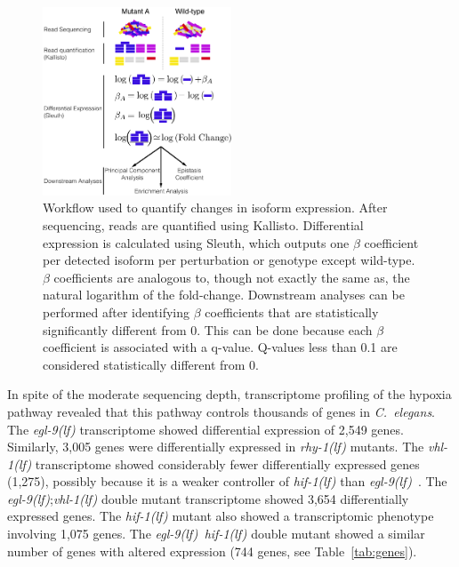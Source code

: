 \documentclass[10pt, onecolumn]{article}
\newcommand{\cel}{\emph{C.~elegans}}
\newcommand{\egl}{\emph{\mbox{egl-9}(lf)}}
\newcommand{\rhy}{\emph{\mbox{rhy-1}(lf)}}
\newcommand{\vhl}{\emph{\mbox{vhl-1}(lf)}}
\newcommand{\eglhif}{\emph{\mbox{egl-9(lf)}~\mbox{hif-1(lf)}}}
\newcommand{\hif}{\emph{\mbox{hif-1(lf)}}}
\newcommand{\egln}{2,549}
\newcommand{\rhyn}{3,005}
\newcommand{\vhln}{1,275}
\newcommand{\eglvhln}{3,654}
\newcommand{\hifn}{1,075}
\newcommand{\eglhifn}{744}
\begin{document}
\begin{figure}[tbhp]
\centering
\includegraphics[width=0.5\textwidth]{../figs/meaningofbeta.pdf}
\caption{Workflow used to quantify changes in isoform expression.
After sequencing, reads are quantified using Kallisto. Differential
expression is calculated using Sleuth, which outputs one $\beta$ coefficient per
detected isoform per perturbation or genotype except wild-type. $\beta$ coefficients
are analogous to, though not exactly the same as, the natural logarithm of the
fold-change. Downstream analyses can be performed after identifying $\beta$ coefficients
that are statistically significantly different from 0. This can be done because
each $\beta$ coefficient is associated with a q-value. Q-values less than 0.1 are
considered statistically different from 0.
}
\label{fig:explain}
\end{figure}

In spite of the moderate sequencing depth, transcriptome profiling of the hypoxia
pathway revealed that this pathway controls thousands of genes in \cel{}. The
\egl{} transcriptome showed differential expression of \egln{} genes. Similarly,
\rhyn{} genes were differentially expressed in \rhy{} mutants. The \vhl{}
transcriptome showed considerably fewer differentially expressed genes (\vhln{}),
possibly because it is a weaker controller of \hif{} than
\egl{}~\cite{Shao2009}. The \egl{};\vhl{} double mutant transcriptome showed
\eglvhln{} differentially expressed genes. The \hif{} mutant also showed a
transcriptomic phenotype involving \hifn{} genes. The \eglhif{} double mutant
showed a similar number of genes with altered expression (\eglhifn{} genes, see
Table~\ref{tab:genes}).
\end{document}
